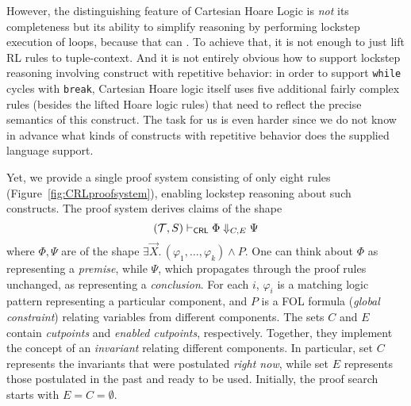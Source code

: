 However, the distinguishing feature of Cartesian Hoare Logic is \emph{not} its
completeness but its ability to simplify reasoning by performing lockstep
execution of loops, because that can .
To achieve that, it is not enough to 
just lift RL rules to tuple-context. And it is not entirely obvious how
to support lockstep reasoning involving construct with repetitive behavior: in
order to support \texttt{while} cycles with \texttt{break}, Cartesian Hoare logic itself uses
five additional fairly complex rules (besides the lifted Hoare logic rules) 
that need to reflect the precise semantics of this construct.  The task for
us is even harder since we do not know in advance what kinds of constructs with
repetitive behavior does the supplied language support.

Yet, we provide a single proof system consisting of only eight rules (Figure~\ref{fig:CRLproofsystem}),
enabling lockstep reasoning about such constructs.
The proof system derives claims of the shape
\begin{equation*}
(\mathcal{T}, S) \vdash_{\mathsf{CRL}} \Phi \Downarrow_{C,E} \Psi
\end{equation*}
where $\Phi,\Psi$ are of the shape $\exists \vec{X}.\, (\varphi_1, \ldots, \varphi_k) \land P$.
One can think about $\Phi$ as representing a \emph{premise}, while
$\Psi$, which propagates through the proof rules unchanged, as representing a
\emph{conclusion}.  For each $i$, $\varphi_i$ is a matching logic
pattern representing a particular component, and $P$ is a FOL
formula (\emph{global constraint}) relating variables from different
components.  The sets $C$ and $E$ contain \emph{cutpoints} and \emph{enabled
  cutpoints}, respectively.  Together, they implement the concept of an
\emph{invariant} relating different components.  In particular, set $C$
represents the invariants that were postulated \emph{right now}, while set
$E$ represents those postulated in the past and ready to be used.
Initially, the proof search starts with $E = C = \emptyset$.


